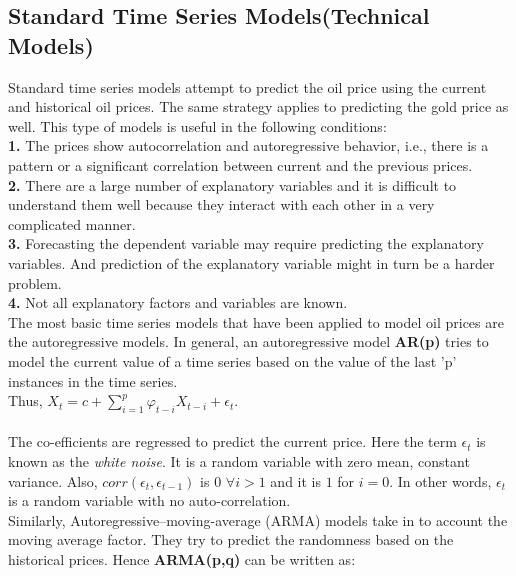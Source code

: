 \documentclass[runningheads]{llncs}
\begin{document}
\subsection{Standard Time Series Models(Technical Models)}
Standard time series models attempt to predict the oil price using the current and historical oil prices. The same strategy applies to predicting the gold price as well. This type of models is useful in the following conditions:\\
\textbf{1.} The prices show autocorrelation and autoregressive behavior, i.e., there is a pattern or a significant correlation between current and the previous prices.\\
\textbf{2.} There are a large number of explanatory variables and it is difficult to understand them well because they interact with each other in a very complicated manner.\\
\textbf{3.} Forecasting the dependent variable may require predicting the explanatory variables. And prediction of the explanatory variable might in turn be a harder problem.\\
\textbf{4.} Not all explanatory factors and variables are known.\\ 

\noindent The most basic time series models that have been applied to model oil prices are the autoregressive models. In general, an autoregressive model \textbf{AR(p)} tries to model the current value of a time series based on the value of the last 'p' instances in the time series.\\

\noindent Thus, $ X_{t} = c + \sum\limits_{i=1}^p \varphi_{t-i}X_{t-i} + \epsilon_{t}$.\\\\

\noindent The co-efficients are regressed to predict the current price. Here the term $\epsilon_{t}$ is known as the \textit{white noise}. It is a random variable with zero mean, constant variance. Also, $corr(\epsilon_t,\epsilon_{t-1})$ is $0$ $\forall i>1$ and it is $1$ for $i=0$. In other words, $\epsilon_{t}$ is a random variable with no auto-correlation.\\

\noindent Similarly, Autoregressive–moving-average (ARMA) models take in to account the moving average factor. They try to predict the randomness based on the historical prices.  Hence \textbf{ARMA(p,q)} can be written as:\\
\end{document}

